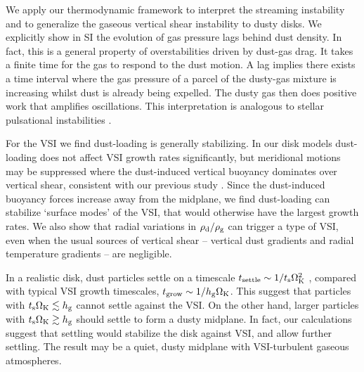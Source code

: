 

We  apply our thermodynamic framework to interpret
the streaming instability \citep[SI, ][]{youdin05a,jacquet11} and to generalize the gaseous vertical shear
instability \citep[VSI, ][]{nelson13,lin15} to dusty disks. We 
explicitly show in SI the evolution of gas 
pressure lags behind dust density. In fact, this is a general property of 
overstabilities driven by dust-gas drag. 
It takes a finite time for the gas to respond to
the dust motion. A lag implies there exists a time interval where 
the gas pressure of a parcel of the dusty-gas mixture is increasing whilst dust is already being expelled.  
The dusty gas then does positive work that amplifies 
oscillations. This interpretation is analogous to stellar pulsational
instabilities \citep{cox67}. 

For the VSI we find dust-loading is generally stabilizing. In our disk models 
dust-loading does not affect VSI growth rates significantly, but
meridional motions may be suppressed where the dust-induced
vertical buoyancy dominates over vertical shear, consistent with our
previous study \citep{lin15}. 
Since the dust-induced buoyancy forces
increase away from the midplane, we find dust-loading can stabilize
`surface modes'  of the VSI, that would otherwise have the largest
growth rates. { We also show that radial variations in
  $\rho_\mathrm{d}/\rho_\mathrm{g}$ can trigger a type of VSI, even when the 
  usual sources of vertical shear -- vertical dust gradients and radial 
  temperature gradients -- are negligible.  
}  

{ In a realistic disk, dust particles settle on a timescale $
  t_\mathrm{settle} \sim 1/t_\mathrm{s}\Omega_{\rm K}^2$ \citep{takeuchi02}, compared 
  with typical VSI growth timescales, $t_\mathrm{grow}\sim 
  1/h_\mathrm{g}\Omega_{\rm K}$. This suggest that particles with $t_\mathrm{s}\Omega_{\rm K}\lesssim 
  h_\mathrm{g}$ cannot settle against the VSI. On the 
  other hand, larger particles with $t_\mathrm{s}\Omega_{\rm K}\gtrsim h_\mathrm{g}$ should
  settle to form a dusty midplane. In fact, our calculations suggest that
  settling would stabilize the disk against VSI, and allow
  further settling. The result may be a quiet, dusty midplane \citep[unless non-axisymmetric
  instabilities develop, ][]{chiang08} with VSI-turbulent gaseous
  atmospheres. 
}


